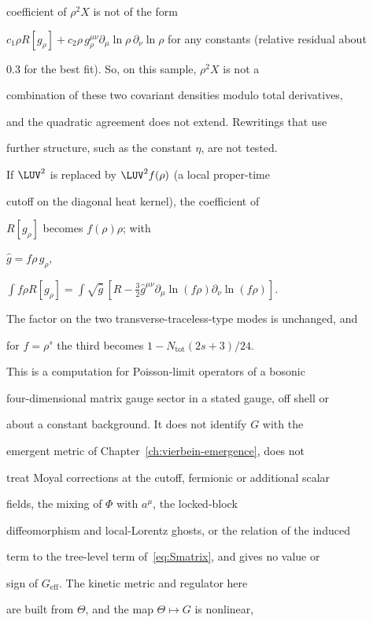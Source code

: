 coefficient of \(\rho^2X\) is not of the form

\(c_1\rho R[g_\rho]+c_2\rho\,g_\rho^{\mu\nu}\partial_\mu\ln\rho\,

\partial_\nu\ln\rho\) for any constants (relative residual about

\(0.3\) for the best fit). So, on this sample, \(\rho^2X\) is not a

combination of these two covariant densities modulo total derivatives,

and the quadratic agreement does not extend. Rewritings that use

further structure, such as the constant \(\eta\), are not tested.



If \(\LUV^2\) is replaced by \(\LUV^2f(\rho)\) (a local proper-time

cutoff on the diagonal heat kernel), the coefficient of

\(R[g_\rho]\) becomes \(f(\rho)\rho\); with

\(\hat g=f\rho\,g_\rho\),

\(\int f\rho R[g_\rho]=\int\sqrt{\hat g}\,[\hat R

-\tfrac32\hat g^{\mu\nu}\partial_\mu\ln(f\rho)\partial_\nu\ln(f\rho)]\).

The factor on the two transverse-traceless-type modes is unchanged, and

for \(f=\rho^s\) the third becomes \(1-N_{\mathrm{tot}}(2s+3)/24\).



This is a computation for Poisson-limit operators of a bosonic

four-dimensional matrix gauge sector in a stated gauge, off shell or

about a constant background. It does not identify \(G\) with the

emergent metric of Chapter~\ref{ch:vierbein-emergence}, does not

treat Moyal corrections at the cutoff, fermionic or additional scalar

fields, the mixing of \(\Phi\) with \(a^\mu\), the locked-block

diffeomorphism and local-Lorentz ghosts, or the relation of the induced

term to the tree-level term of~\eqref{eq:Smatrix}, and gives no value or

sign of \(G_{\mathrm{eff}}\). The kinetic metric and regulator here

are built from \(\Theta\), and the map \(\Theta\mapsto G\) is nonlinear,

